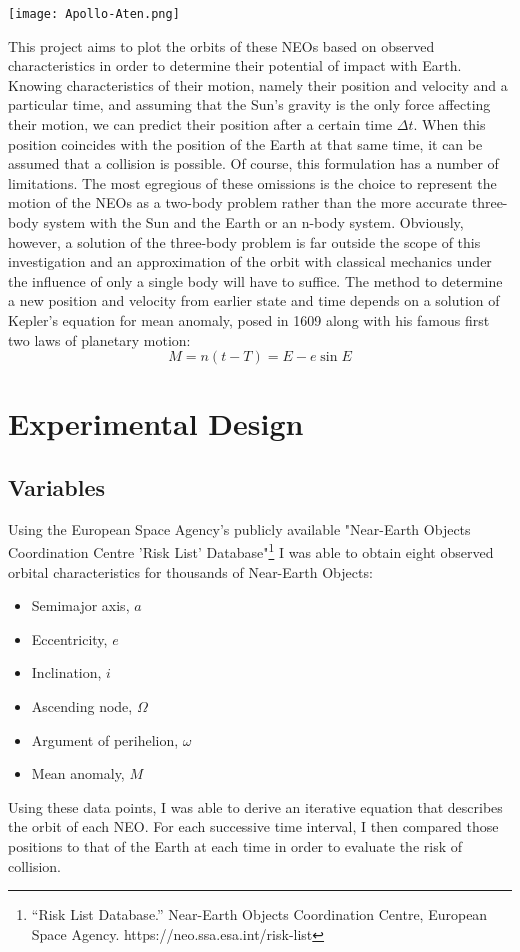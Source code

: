 \documentclass[12pt]{article}
\begin{document}
\begin{center}
    \texttt{[image: Apollo-Aten.png]}
\end{center}

This project aims to plot the orbits of these NEOs based on observed characteristics in order to determine their potential of impact with Earth. Knowing characteristics of their motion, namely their position and velocity and a particular time, and assuming that the Sun's gravity is the only force affecting their motion, we can predict their position after a certain time $\Delta t$. When this position coincides with the position of the Earth at that same time, it can be assumed that a collision is possible. Of course, this formulation has a number of limitations. The most egregious of these omissions is the choice to represent the motion of the NEOs as a two-body problem rather than the more accurate three-body system with the Sun and the Earth or an n-body system. Obviously, however, a solution of the three-body problem is far outside the scope of this investigation and an approximation of the orbit with classical mechanics under the influence of only a single body will have to suffice. The method to determine a new position and velocity from earlier state and time depends on a solution of Kepler's equation for mean anomaly, posed in 1609 along with his famous first two laws of planetary motion:
$$M = n (t - T) = E - e \sin E$$

\section{Experimental Design}
\subsection{Variables}
Using the European Space Agency's publicly available "Near-Earth Objects Coordination Centre 'Risk List' Database"\footnote{“Risk List Database.” Near-Earth Objects Coordination Centre, European Space Agency. https://neo.ssa.esa.int/risk-list } I was able to obtain eight observed orbital characteristics for thousands of Near-Earth Objects:
\begin{itemize}
    \item Semimajor axis, $a$
    \item Eccentricity, $e$
    \item Inclination, $i$
    \item Ascending node, $\Omega$
    \item Argument of perihelion, $\omega$
    \item Mean anomaly, $M$
\end{itemize}
Using these data points, I was able to derive an iterative equation that describes the orbit of each NEO. For each successive time interval, I then compared those positions to that of the Earth at each time in order to evaluate the risk of collision.
\end{document}
